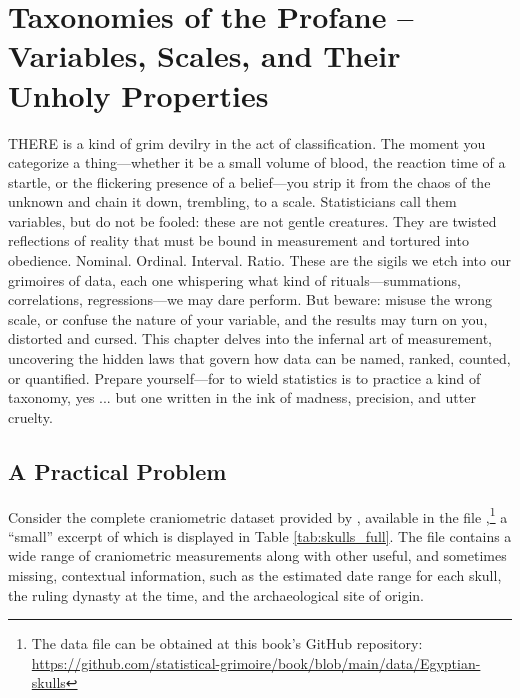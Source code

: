\chapter{Taxonomies of the Profane – Variables, Scales, and Their Unholy Properties}

\IMFellEnglish
\lettrine[lines=5, realheight]{T}{HERE} is a kind of grim devilry in the act of classification. The moment you categorize a thing—whether it be a small volume of blood, the reaction time of a startle, or the flickering presence of a belief—you strip it from the chaos of the unknown and chain it down, trembling, to a scale. Statisticians call them variables, but do not be fooled: these are not gentle creatures. They are twisted reflections of reality that must be bound in measurement and tortured into obedience. Nominal. Ordinal. Interval. Ratio. These are the sigils we etch into our grimoires of data, each one whispering what kind of rituals—summations, correlations, regressions—we may dare perform. But beware: misuse the wrong scale, or confuse the nature of your variable, and the results may turn on you, distorted and cursed. This chapter delves into the infernal art of measurement, uncovering the hidden laws that govern how data can be named, ranked, counted, or quantified. Prepare yourself—for to wield statistics is to practice a kind of taxonomy, yes  ... but one written in the ink of madness, precision, and utter cruelty.

\normalfont

\section{A Practical Problem}

Consider the complete craniometric dataset provided by  \textcite{Thomson1905}, available in the file ,\footnote{The data file can be obtained at this book's GitHub repository: \url{https://github.com/statistical-grimoire/book/blob/main/data/Egyptian-skulls}} a ``small'' excerpt of which is displayed in Table \ref{tab:skulls_full}. The file contains a wide range of craniometric measurements along with other useful, and sometimes missing, contextual information, such as the estimated date range for each skull, the ruling dynasty at the time, and the archaeological site of origin. 

